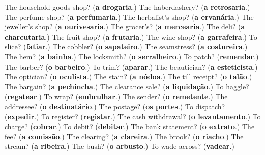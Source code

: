 \begin{tcolorbox}[breakable,colback=teal!4,colframe=teal!35!black,title={Before you move on}]
The household goods shop? (\textbf{a drogaria}.) The haberdashery? (\textbf{a retrosaria}.) The perfume shop? (\textbf{a perfumaria}.) The herbalist's shop? (\textbf{a ervanária}.) The jeweller's shop? (\textbf{a ourivesaria}.) The grocer's? (\textbf{a mercearia}.) The deli? (\textbf{a charcutaria}.) The fruit shop? (\textbf{a frutaria}.) The wine shop? (\textbf{a garrafeira}.) To slice? (\textbf{fatiar}.) The cobbler? (\textbf{o sapateiro}.) The seamstress? (\textbf{a costureira}.) The hem? (\textbf{a bainha}.) The locksmith? (\textbf{o serralheiro}.) To patch? (\textbf{remendar}.) The barber? (\textbf{o barbeiro}.) To trim? (\textbf{aparar}.) The beautician? (\textbf{a esteticista}.) The optician? (\textbf{o oculista}.) The stain? (\textbf{a nódoa}.) The till receipt? (\textbf{o talão}.) The bargain? (\textbf{a pechincha}.) The clearance sale? (\textbf{a liquidação}.) To haggle? (\textbf{regatear}.) To wrap? (\textbf{embrulhar}.) The sender? (\textbf{o remetente}.) The addressee? (\textbf{o destinatário}.) The postage? (\textbf{os portes}.) To dispatch? (\textbf{expedir}.) To register? (\textbf{registar}.) The cash withdrawal? (\textbf{o levantamento}.) To charge? (\textbf{cobrar}.) To debit? (\textbf{debitar}.) The bank statement? (\textbf{o extrato}.) The fee? (\textbf{a comissão}.) The clearing? (\textbf{a clareira}.) The brook? (\textbf{o riacho}.) The stream? (\textbf{a ribeira}.) The bush? (\textbf{o arbusto}.) To wade across? (\textbf{vadear}.)
\end{tcolorbox}
